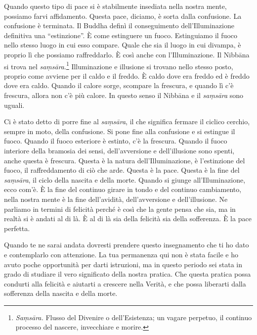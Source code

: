 Quando questo tipo di pace si è stabilmente insediata nella nostra
mente, possiamo farvi affidamento. Questa pace, diciamo, è sorta dalla
confusione. La confusione è terminata. Il Buddha definì il conseguimento
dell'Illuminazione definitiva una ``estinzione''. È come estinguere un
fuoco. Estinguiamo il fuoco nello stesso luogo in cui esso compare.
Quale che sia il luogo in cui divampa, è proprio lì che possiamo
raffreddarlo. È così anche con l'Illuminazione. Il Nibbāna si
trova nel \emph{saṃsāra}.\footnote{\emph{Saṃsāra.} Flusso del Divenire o
  dell'Esistenza; un vagare perpetuo, il continuo processo del nascere,
  invecchiare e morire.} Illuminazione e illusione si trovano nello
stesso posto, proprio come avviene per il caldo e il freddo. È caldo
dove era freddo ed è freddo dove era caldo. Quando il calore sorge,
scompare la frescura, e quando lì c'è frescura, allora non c'è più
calore. In questo senso il Nibbāna e il \emph{saṃsāra} sono
uguali.

Ci è stato detto di porre fine al \emph{saṃsāra}, il che significa
fermare il ciclico cerchio, sempre in moto, della confusione. Si pone
fine alla confusione e si estingue il fuoco. Quando il fuoco esteriore è
estinto, c'è la frescura. Quando il fuoco interiore della bramosia dei
sensi, dell'avversione e dell'illusione sono spenti, anche questa è
frescura. Questa è la natura dell'Illuminazione, è l'estinzione del
fuoco, il raffreddamento di ciò che arde. Questa è la pace. Questa è la
fine del \emph{saṃsāra}, il ciclo della nascita e della morte. Quando si
giunge all'Illuminazione, ecco com'è. È la fine del continuo girare in
tondo e del continuo cambiamento, nella nostra mente è la fine
dell'avidità, dell'avversione e dell'illusione. Ne parliamo in termini
di felicità perché è così che la gente pensa che sia, ma in realtà si è
andati al di là. È al di là sia della felicità sia della sofferenza. È
la pace perfetta.

Quando te ne sarai andata dovresti prendere questo insegnamento che ti
ho dato e contemplarlo con attenzione. La tua permanenza qui non è stata
facile e ho avuto poche opportunità per darti istruzioni, ma in questo
periodo sei stata in grado di studiare il vero significato della nostra
pratica. Che questa pratica possa condurti alla felicità e aiutarti a
crescere nella Verità, e che possa liberarti dalla sofferenza della
nascita e della morte.

